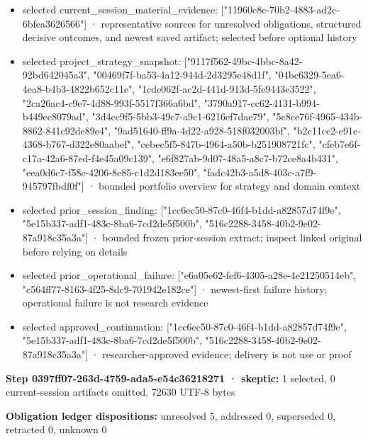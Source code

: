 \documentclass[11pt]{article}
\begin{document}
\begin{itemize}
\item selected current\_session\_material\_evidence: ["11960c8c-70b2-4883-ad2c-6bfea3626566"] · representative sources for unresolved obligations, structured decisive outcomes, and newest saved artifact; selected before optional history
\item selected project\_strategy\_snapshot: ["9117f562-49bc-4bbc-8a42-92bd642045a3", "00469f7f-ba53-4a12-944d-2d3295e48d1f", "04bc6329-5ea6-4ea8-b4b3-4822b652c11e", "1cde062f-ac2d-441d-913d-5fe9443e3522", "2ca26ac4-c9e7-4d88-993f-5517f366a6bd", "3790a917-cc62-4131-b994-b449ec8079ad", "3d4cc9f5-5bb3-49c7-a9c1-6216ef7dae79", "5c8ce76f-4965-434b-8862-841c92de89e4", "9ad51640-ff9a-4d22-a928-518f032003bf", "b2c11cc2-e91c-4368-b767-d322e80aabef", "cebec5f5-847b-4964-a50b-b251908721fc", "cfeb7e6f-c17a-42a6-87ed-f4e45a09c139", "e6f827ab-9d07-48a5-a8c7-b72ce8a4b431", "eea0d6c7-f58c-4206-8e85-c1d2d183ee50", "fadc42b3-a5d8-403c-a7f9-945797fbdf0f"] · bounded portfolio overview for strategy and domain context
\item selected prior\_session\_finding: ["1cc6ec50-87c0-46f4-b1dd-a82857d74f9e", "5e15b337-adf1-483c-8ba6-7cd2de5f500b", "516c2288-3458-40b2-9e02-87a918c35a3a"] · bounded frozen prior-session extract; inspect linked original before relying on details
\item selected prior\_operational\_failure: ["e6a05e62-fef6-4305-a28e-4e21250514eb", "c564ff77-8163-4f25-8dc9-701942e182ce"] · newest-first failure history; operational failure is not research evidence
\item selected approved\_continuation: ["1cc6ec50-87c0-46f4-b1dd-a82857d74f9e", "5e15b337-adf1-483c-8ba6-7cd2de5f500b", "516c2288-3458-40b2-9e02-87a918c35a3a"] · researcher-approved evidence; delivery is not use or proof
\end{itemize}
\textbf{Step 0397ff07-263d-4759-ada5-e54c36218271 · skeptic:} 1 selected, 0 current-session artifacts omitted, 72630 UTF-8 bytes\par
\textbf{Obligation ledger dispositions:} unresolved 5, addressed 0, superseded 0, retracted 0, unknown 0\par
\end{document}
